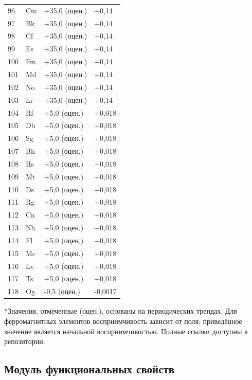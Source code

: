 \documentclass[12pt,a4paper]{article}
\begin{document}
\begin{longtable}{p{0.6cm}p{1.2cm}p{2.5cm}p{2.5cm}}
		96 & Cm & +35,0 (оцен.) & +0,14 \\
		97 & Bk & +35,0 (оцен.) & +0,14 \\
		98 & Cf & +35,0 (оцен.) & +0,14 \\
		99 & Es & +35,0 (оцен.) & +0,14 \\
		100& Fm & +35,0 (оцен.) & +0,14 \\
		101& Md & +35,0 (оцен.) & +0,14 \\
		102& No & +35,0 (оцен.) & +0,14 \\
		103& Lr & +35,0 (оцен.) & +0,14 \\
		104& Rf & +5,0 (оцен.) & +0,018 \\
		105& Db & +5,0 (оцен.) & +0,018 \\
		106& Sg & +5,0 (оцен.) & +0,018 \\
		107& Bh & +5,0 (оцен.) & +0,018 \\
		108& Hs & +5,0 (оцен.) & +0,018 \\
		109& Mt & +5,0 (оцен.) & +0,018 \\
		110& Ds & +5,0 (оцен.) & +0,018 \\
		111& Rg & +5,0 (оцен.) & +0,018 \\
		112& Cn & +5,0 (оцен.) & +0,018 \\
		113& Nh & +5,0 (оцен.) & +0,018 \\
		114& Fl & +5,0 (оцен.) & +0,018 \\
		115& Mc & +5,0 (оцен.) & +0,018 \\
		116& Lv & +5,0 (оцен.) & +0,018 \\
		117& Ts & +5,0 (оцен.) & +0,018 \\
		118& Og & -0,5 (оцен.) & -0,0017 \\
		\bottomrule
	\end{longtable}
	*Значения, отмеченные (оцен.), основаны на периодических трендах. Для ферромагнитных элементов восприимчивость зависит от поля; приведённое значение является начальной восприимчивостью. Полные ссылки доступны в репозитории.
	
	
	\subsection{Модуль функциональных свойств}
	\label{subsec:functional-properties}
	
\end{document}
